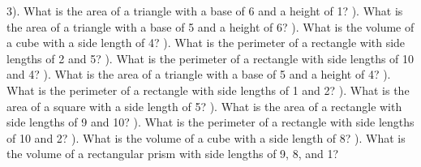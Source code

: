 \documentclass{article}%
\begin{document}
3). What is the area of a triangle with a base of 6 and a height of 1?%
\newline%
\newline%
). What is the area of a triangle with a base of 5 and a height of 6?%
\newline%
\newline%
). What is the volume of a cube with a side length of 4?%
\newline%
\newline%
). What is the perimeter of a rectangle with side lengths of 2 and 5?%
\newline%
\newline%
). What is the perimeter of a rectangle with side lengths of 10 and 4?%
\newline%
\newline%
). What is the area of a triangle with a base of 5 and a height of 4?%
\newline%
\newline%
). What is the perimeter of a rectangle with side lengths of 1 and 2?%
\newline%
\newline%
). What is the area of a square with a side length of 5?%
\newline%
\newline%
). What is the area of a rectangle with side lengths of 9 and 10?%
\newline%
\newline%
). What is the perimeter of a rectangle with side lengths of 10 and 2?%
\newline%
\newline%
). What is the volume of a cube with a side length of 8?%
\newline%
\newline%
). What is the volume of a rectangular prism with side lengths of 9, 8, and 1?%
\newline%
\newline%
\newline%
\end{document}
